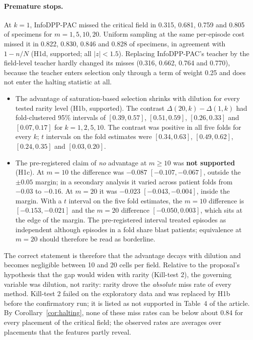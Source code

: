 \documentclass[11pt]{article}
\theoremstyle{remark}
\theoremstyle{definition}
\begin{document}
\paragraph{Premature stops.} At $k=1$, InfoDPP-PAC missed the critical field in 0.315, 0.681, 0.759 and 0.805 of specimens for $m=1,5,10,20$. Uniform sampling at the same per-episode cost missed it in 0.822, 0.830, 0.846 and 0.828 of specimens, in agreement with $1-n/N$ (H1d, supported; all $|z|<1.5$). Replacing InfoDPP-PAC's teacher by the field-level teacher hardly changed its misses (0.316, 0.662, 0.764 and 0.770), because the teacher enters selection only through a term of weight 0.25 and does not enter the halting statistic at all.
\begin{itemize}
\item The advantage of saturation-based selection shrinks with dilution for every tested rarity level (H1b, supported). The contrast $\Delta(20,k)-\Delta(1,k)$ had fold-clustered 95\% intervals of $[0.39,0.57]$, $[0.51,0.59]$, $[0.26,0.33]$ and $[0.07,0.17]$ for $k=1,2,5,10$. The contrast was positive in all five folds for every $k$; $t$ intervals on the fold estimates were $[0.34,0.63]$, $[0.49,0.62]$, $[0.24,0.35]$ and $[0.03,0.20]$.
\item The pre-registered claim of \emph{no} advantage at $m\ge10$ was \textbf{not supported} (H1c). At $m=10$ the difference was $-0.087$ $[-0.107,-0.067]$, outside the $\pm0.05$ margin; in a secondary analysis it varied across patient folds from $-0.03$ to $-0.16$. At $m=20$ it was $-0.023$ $[-0.043,-0.004]$, inside the margin. With a $t$ interval on the five fold estimates, the $m=10$ difference is $[-0.153,-0.021]$ and the $m=20$ difference $[-0.050,0.003]$, which sits at the edge of the margin. The pre-registered interval treated episodes as independent although episodes in a fold share blast patients; equivalence at $m=20$ should therefore be read as borderline.
\end{itemize}
The correct statement is therefore that the advantage decays with dilution and becomes negligible between 10 and 20 cells per field. Relative to the proposal's hypothesis that the gap would widen with rarity (Kill-test 2), the governing variable was dilution, not rarity: rarity drove the \emph{absolute} miss rate of every method. Kill-test 2 failed on the exploratory data and was replaced by H1b before the confirmatory run; it is listed as not supported in Table~4 of the article. By Corollary~\ref{cor:halting}, none of these miss rates can be below about 0.84 for every placement of the critical field; the observed rates are averages over placements that the features partly reveal.
\end{document}
